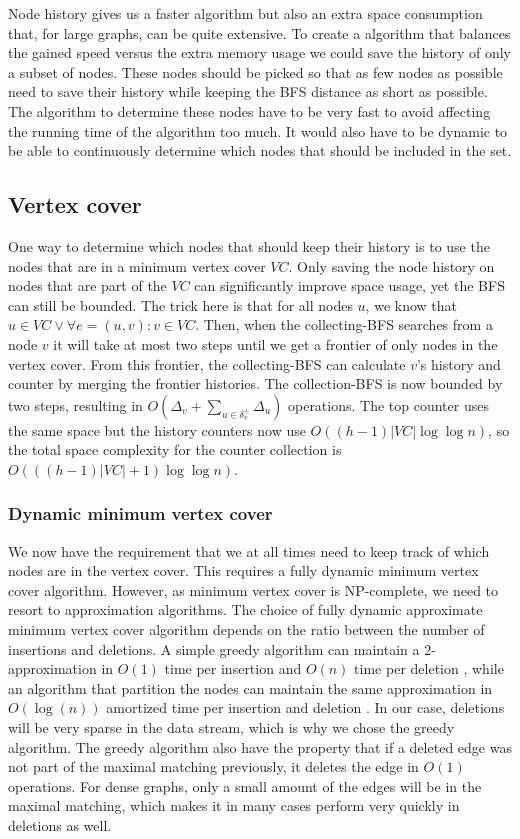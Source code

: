 Node history gives us a faster algorithm but also an extra space consumption that, for large graphs, can be quite extensive. To create a  algorithm that balances the gained speed versus the extra memory usage we could save the history of only a subset of nodes. These nodes should be picked so that as few nodes as possible need to save their history while keeping the BFS distance as short as possible. The algorithm to determine these nodes have to be very fast to avoid affecting the running time of the algorithm too much. It would also have to be dynamic to be able to continuously determine which nodes that should be included in the set.

\subsection{Vertex cover}
One way to determine which nodes that should keep their history is to use the nodes that are in a minimum vertex cover $VC$. Only saving the node history on nodes that are part of the $VC$ can significantly improve space usage, yet the BFS can still be bounded. The trick here is that for all nodes $u$, we know that $u \in VC \vee \forall e = (u,v) : v \in VC$. Then, when the collecting-BFS searches from a node $v$ it will take at most two steps until we get a frontier of only nodes in the vertex cover. From this frontier, the collecting-BFS can calculate $v$'s history and counter by merging the frontier histories. The collection-BFS is now bounded by two steps, resulting in $O(\Delta_v + \sum_{u \in \delta^+_v}{\Delta_u}) $ operations. The top counter uses the same space but the history counters now use $O((h-1)|VC| \log \log n)$, so the total space complexity for the counter collection is $O(((h-1)|VC| + 1 )\log \log n)$.


\subsubsection{Dynamic minimum vertex cover}
We now have the requirement that we at all times need to keep track of which nodes are in the vertex cover. This requires a fully dynamic minimum vertex cover algorithm. However, as minimum vertex cover is NP-complete, we need to resort to approximation algorithms. The choice of fully dynamic approximate minimum vertex cover algorithm depends on the ratio between the number of insertions and deletions. A simple greedy algorithm can maintain a $2$-approximation in $O(1)$ time per insertion and $O(n)$ time per deletion \cite{2appdynvc}, while an algorithm that partition the nodes can maintain the same approximation in $O(\log(n))$ amortized time per insertion and deletion \cite{2appdynvclogn}. In our case,  deletions will be very sparse in the data stream, which is why we chose the greedy algorithm. The greedy algorithm also have the property that if a deleted edge was not part of the maximal matching previously, it deletes the edge in $O(1)$ operations. For dense graphs, only a small amount of the edges will be in the maximal matching, which makes it in many cases perform very quickly in deletions as well. 

